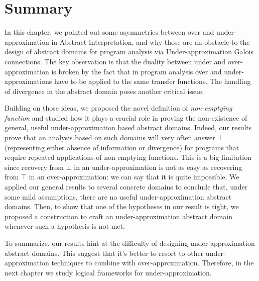 \section{Summary}
In this chapter, we pointed out some asymmetries between over and under-approximation in Abstract Interpretation, and why those are an obstacle to the design of abstract domains for program analysis via Under-approximation Galois connections. The key observation is that the duality between under and over-approximation is broken by the fact that in program analysis over and under-approximations have to be applied to the same transfer functions. The handling of divergence in the abstract domain poses another critical issue.

Building on those ideas, we proposed the novel definition of \emph{non-emptying function} and studied how it plays a crucial role in proving the non-existence of general, useful under-approximation based abstract domains. Indeed, our results prove that an analysis based on such domains will very often answer $\bot$ (representing either absence of information or divergence) for programs that require repeated applications of non-emptying functions. This is a big limitation since recovery from $\bot$ in an under-approximation is not as easy as recovering from $\top$ in an over-approximation: we can say that it is quite impossible.
We applied our general results to several concrete domains to conclude that, under some mild assumptions, there are no useful under-approximation abstract domains. Then, to show that one of the hypotheses in our result is tight, we proposed a construction to craft an under-approximation abstract domain whenever such a hypothesis is not met.

To summarize, our results hint at the difficulty of designing under-approximation abstract domains. This suggest that it's better to resort to other under-approximation techniques to combine with over-approximation. Therefore, in the next chapter we study logical frameworks for under-approximation.

